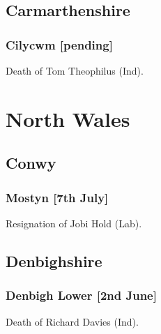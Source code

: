 \documentclass[a4paper,openany]{book}
\begin{document}
\begin{resultsiii}
\subsection*{Carmarthenshire}

\subsubsection*{Cilycwm \hspace*{\fill}\nolinebreak[1]%
\enspace\hspace*{\fill}
[pending]}


Death of Tom Theophilus (Ind).

\section{North Wales}

\subsection*{Conwy}

\subsubsection*{Mostyn \hspace*{\fill}\nolinebreak[1]%
\enspace\hspace*{\fill}
[7th July]}


Resignation of Jobi Hold (Lab).

\subsection*{Denbighshire}

\subsubsection*{Denbigh Lower \hspace*{\fill}\nolinebreak[1]%
\enspace\hspace*{\fill}
[2nd June]}


Death of Richard Davies (Ind).


\end{resultsiii}
\end{document}
